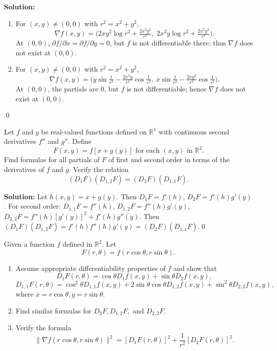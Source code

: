 \noindent\textbf{Solution:}
\begin{enumerate}[label=(\alph*)]
\item For $(x,y)\ne(0,0)$ with $r^2=x^2+y^2$,
\[\nabla f(x,y)=\big(2xy^2\log r^2+\tfrac{2x^3y^2}{r^2},\;2x^2y\log r^2+\tfrac{2x^2y^3}{r^2}\big).\]
At $(0,0)$, $\partial f/\partial x=\partial f/\partial y=0$, but $f$ is not differentiable there; thus $\nabla f$ does not exist at $(0,0)$.
\item For $(x,y)\ne(0,0)$ with $r^2=x^2+y^2$,
\[\nabla f(x,y)=\big(y\sin\tfrac{1}{r^2}-\tfrac{2x^2y}{r^4}\cos\tfrac{1}{r^2},\;x\sin\tfrac{1}{r^2}-\tfrac{2xy^2}{r^4}\cos\tfrac{1}{r^2}\big).\]
At $(0,0)$, the partials are $0$, but $f$ is not differentiable; hence $\nabla f$ does not exist at $(0,0)$.
\end{enumerate}\qed


\begin{problembox}
Let \( f \) and \( g \) be real-valued functions defined on \( \mathbb{R}^1 \) with continuous second derivatives \( f'' \) and \( g'' \). Define
\[F(x, y) = f[x + g(y)] \text{ for each } (x, y) \text{ in } \mathbb{R}^2.\]
Find formulas for all partials of \( F \) of first and second order in terms of the derivatives of \( f \) and \( g \). Verify the relation
\[(D_1F)(D_{1,2}F) = (D_2F)(D_{1,1}F).\]
\end{problembox}

\noindent\textbf{Solution:}
Let $h(x,y)=x+g(y)$. Then $D_1F=f'(h)$, $D_2F=f'(h)g'(y)$. For second order: $D_{1,1}F=f''(h)$, $D_{1,2}F=f''(h)g'(y)$, $D_{2,2}F=f''(h)[g'(y)]^2+f'(h)g''(y)$. Then $(D_1F)(D_{1,2}F)=f'(h)f''(h)g'(y)=(D_2F)(D_{1,1}F)$.\qed


\begin{problembox}
Given a function \( f \) defined in \( \mathbb{R}^2 \). Let
\[F(r, \theta) = f(r \cos \theta, r \sin \theta).\]
\begin{enumerate}[label=(\alph*)]
\item Assume appropriate differentiability properties of \( f \) and show that
\[D_1F(r, \theta) = \cos \theta D_1f(x, y) + \sin \theta D_2f(x, y),\]
\[D_{1,1}F(r, \theta) = \cos^2 \theta D_{1,1}f(x, y) + 2 \sin \theta \cos \theta D_{1,2}f(x, y) + \sin^2 \theta D_{2,2}f(x, y),\]
where \( x = r \cos \theta, y = r \sin \theta \).
\item Find similar formulas for \( D_2F, D_{1,2}F, \) and \( D_{2,2}F \).
\item Verify the formula
\[\| \nabla f(r \cos \theta, r \sin \theta) \|^2 = [D_1F(r, \theta)]^2 + \frac{1}{r^2} [D_2F(r, \theta)]^2.\]
\end{enumerate}
\end{problembox}


